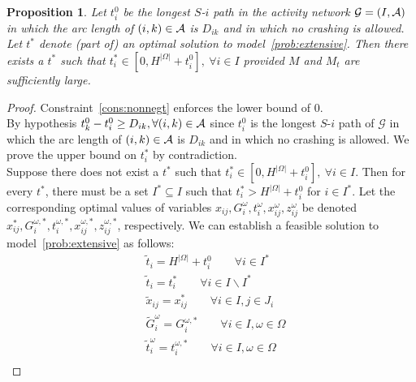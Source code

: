 \documentclass[11pt]{article}
\newtheorem{proposition}[theorem]{Proposition}
\newcommand{\cA}{{\cal A}}
\begin{document}
	{
		\begin{proposition} \label{prop:bounds}
			Let \(t_i^0\) be the longest \(S\)-\(i\) path in the activity network \(\mathcal{G} = (I,\cA)\) in which the arc length of \((i,k) \in \cA\) is \(D_{ik}\) and in which no crashing is allowed. Let \(t^*\) denote (part of) an optimal solution to model~\eqref{prob:extensive}. Then there exists a \(t^*\) such that \(t^*_i \in [0,H^{|\Omega|} + t_i^0],\ \forall i \in I\) provided $M$ and $M_t$ are sufficiently large.
		\end{proposition}
		\begin{proof}
			Constraint~\eqref{cons:nonnegt} enforces the lower bound of $0$. \\
			\newline 
			By hypothesis \(t_k^0 - t_i^0 \geq D_{ik}, \forall (i,k) \in \cA\) since \(t_i^0\) is the longest \(S\)-\(i\) path of \(\mathcal{G}\) in which the arc length of \((i,k) \in \cA\) is \(D_{ik}\) and in which no crashing is allowed. We prove the upper bound on \(t_i^*\) by contradiction. \\
			\newline
			Suppose there does not exist a \(t^*\) such that \(t^*_i \in [0,H^{|\Omega|} + t_i^0],\ \forall i \in I\). Then for every \(t^*\), there must be a set \(I^* \subseteq I\) such that \(t_i^* > H^{|\Omega|} + t^0_i\) for $i \in I^*$. Let the corresponding optimal values of variables \(x_{ij}, G_i^\omega, t_i^\omega, x_{ij}^\omega, z_{ij}^\omega\) be denoted \(x_{ij}^*, G_i^{\omega,*}, t_i^{\omega,*}, x_{ij}^{\omega,*}, z_{ij}^{\omega,*}\), respectively. We can establish a feasible solution to model~\eqref{prob:extensive} as follows:
			\begin{subequations} \label{eqn:feasSol}
				\begin{align}
				& \tilde{t}_i = H^{|\Omega|} + t^0_i \qquad \forall i \in I^* \label{eqn:tequal1} \\
				& \tilde{t}_i = t_i^* \qquad \forall i \in I \backslash I^* \label{eqn:tequal2}\\
				& \tilde{x}_{ij} = x_{ij}^* \qquad \forall i \in I, j \in J_i \\
				& \tilde{G}_i^\omega = G_i^{\omega,*} \qquad \forall i \in I, \omega \in \Omega \\
				& \tilde{t}_i^\omega = t^{\omega,*}_i \qquad \forall i \in I, \omega \in \Omega \\

\end{align}
\end{subequations}
\end{proof}}
\end{document}
